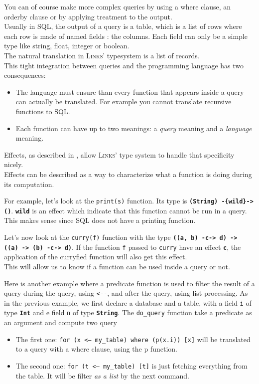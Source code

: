 \documentclass[11pt]{article}
\newcommand\mysc[1]{{\rmfamily\textsc{#1}}\xspace}
\newcommand\links{\mysc{Links}}
\newcommand\sql{\mysc{SQL}}
\newcommand\sig[1]{{\tt\bf #1}}
\newcommand\code[1]{{\tt #1}}
\newcommand\linkslst[1]{}
\newcommand\effect[1]{{\em #1}}
\begin{document}
You can of course make more complex queries by using a where clause, an orderby clause or by applying treatment to the output.\\

Usually in \sql, the output of a query is a table, which is a list of rows where each row is made of named fields : the columns. Each field can only be a simple type like string, float, integer or boolean.\\
The natural translation in \links' typesystem is a list of records.\\

This tight integration between queries and the programming language has two consequences:
\begin{itemize}
\item The language must ensure than every function that appears inside a query can actually be translated. For example you cannot translate recursive functions to \sql.
\item Each function can have up to two meanings: a \effect{query} meaning and a \effect{language} meaning.
\end{itemize}

Effects, as described in \cite{links:effect}, allow \links' type system to handle that specificity nicely.\\

Effects can be described as a way to characterize what a function is doing during its computation. 

For example, let's look at the \code{print(s)} function. Its type is \sig{(String) -\{wild\}-> ()}. \sig{wild} is an effect which indicate that this function cannot be run in a query. This makes sense since \sql does not have a printing function.

Let's now look at the \code{curry(f)} function with the type \sig{((a, b) -c-> d) -> ((a) -> (b) -c-> d)}. If the function \code{f} passed to \code{curry} have an effect \sig{c}, the application of the curryfied function will also get this effect.\\

This will allow us to know if a function can be used inside a query or not.\newpage

Here is another example where a predicate function is used to filter the result of a query during the query, using \code{<-\--}, and after the query, using list processing.
\linkslst{querypredicat.links}\label{examplepred}
As in the previous example, we first declare a database and a table, with a field \code{i} of type \sig{Int} and e field \code{n} of type \sig{String}.
The \code{do_query} function take a predicate as an argument and compute two query
\begin{itemize}
\item The first one: \code{for (x <-- my_table) where (p(x.i)) [x]} will be translated to a query with a where clause, using the p function.
\item The second one: \code{for (t <-- my_table) [t]} is just fetching everything from the table. It will be filter \emph{as a list} by the next command.
\end{itemize}
\end{document}
